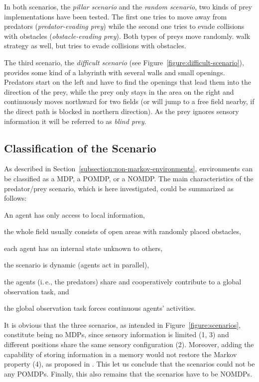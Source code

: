 In both scenarios, the \emph{pillar scenario} and the \emph{random scenario}, two kinds of prey implementations have been tested. The first one tries to move away from predators (\emph{predator-evading prey}) while the second one tries to evade collisions with obstacles  (\emph{obstacle-evading prey}). Both types of preys move randomly.  walk strategy as well, but tries to evade collisions with obstacles.

The third scenario, the \emph{difficult scenario} (see Figure~\ref{figure:difficult-scenario}), provides some kind of a labyrinth with several walls and small openings. Predators start on the left and have to find the openings that lead them into the direction of the prey, while the prey only stays in the area on the right and continuously moves northward for two fields (or will jump to a free field nearby, if the direct path is blocked in northern direction). As the prey ignores sensory information it will be referred to as \emph{blind prey}.


\subsection{Classification of the Scenario}
\label{subsection:scenario-classification}

As described in Section~\ref{subsection:non-markov-environments}, environments can be classified as a MDP, a POMDP, or a NOMDP. The main characteristics of the predator/prey scenario, which is here investigated, could be summarized as follows:

\begin{enumerate*}
	\item An agent has only access to local information,
	\item the whole field usually consists of open areas with randomly placed obstacles,
	\item each agent has an internal state unknown to others,
	\item the scenario is dynamic (agents act in parallel),
	\item the agents (i.\,e., the predators) share and cooperatively contribute to a glo\-bal observation task, and
	\item the global observation task forces continuous agents' activities.  
\end{enumerate*}

It is obvious that the three scenarios, as intended in Figure~\ref{figure:scenarios}, constitute being no MDPs, since sensory information is limited (1, 3) and different positions share the same sensory configuration (2). Moreover, adding the capability of storing information in a memory would not restore the Markov property (4), as proposed in \cite{Lan98,LW00}. This let us conclude that the scenarios could not be any POMDPs. Finally, this also remains that the scenarios have to be NOMDPs. 

